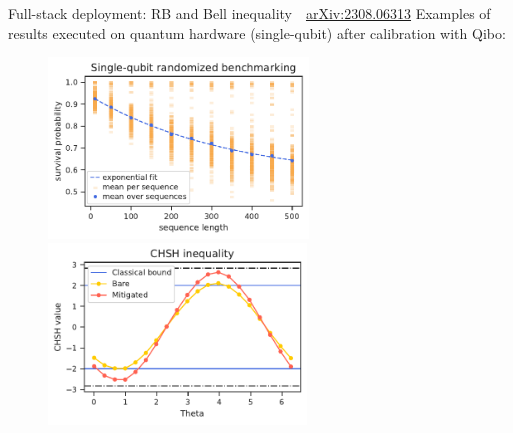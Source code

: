 \documentclass[aspectratio=169, 10pt, xcolor={svgnames}, hyperref={linkcolor=black}]{beamer}
\begin{document}
\begin{frame}[fragile]{Full-stack deployment: RB and Bell inequality \hfill \faBook\,\, \href{https://arxiv.org/abs/2308.06313}{arXiv:2308.06313}}
  Examples of results executed on quantum hardware (single-qubit) after calibration with Qibo:
  \begin{figure}
    \includegraphics[height=4.8cm]{figures/standard_rb.pdf}
    \includegraphics[height=4.8cm]{figures/bell_sweep_fig.pdf}
  \end{figure}
\end{frame}
\end{document}
